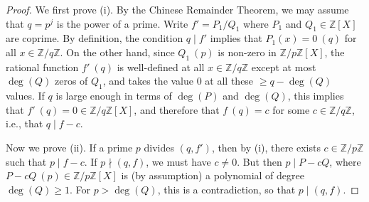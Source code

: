 \documentclass[12pt,a4paper,reqno]{amsart}
\numberwithin{equation}{section}
\theoremstyle{plain}
\theoremstyle{definition}
\newcommand\Z{\mathbb{Z}}
\begin{document}
\begin{proof}  
  We first prove (i). By the Chinese Remainder Theorem, we may assume that $q=p^j$ is
  the power of a prime.  Write $f'=P_1/Q_1$ where $P_1$ and
  $Q_1\in\Z[X]$ are coprime. By definition, the condition $q\mid f'$
  implies that $P_1(x)=0\ (q)$ for all $x\in \Z/q\Z$. On the other
  hand, since $Q_1\ (p)$ is non-zero in $\Z/p\Z[X]$, the rational
  function $f'\ (q)$ is well-defined at all $x\in \Z/q\Z$ except at
  most $\deg(Q)$ zeros of $Q_1$, and takes the value $0$ at all these
  $\geq q-\deg(Q)$ values. If $q$ is large enough in terms of
  $\deg(P)$ and $\deg(Q)$, this implies that $f'\ (q)=0\in \Z/q\Z[X]$,
  and therefore that $f\ (q)=c$ for some $c\in\Z/q\Z$, i.e., that
  $q\mid f-c$.
\par
Now we prove (ii). If a prime $p$ divides $(q,f')$, then by (i), there exists $c\in
\Z/p\Z$ such that $p\mid f-c$. If $p\nmid (q,f)$, we must have
$c \neq 0$. But then $p\mid P-cQ$, where $P-cQ\ (p)\in\Z/p\Z[X]$ is (by
assumption) a polynomial of degree $\deg(Q)\geq 1$. For $p>\deg(Q)$,
this is a contradiction, so that $p\mid (q,f)$.
\end{proof}
\end{document}
